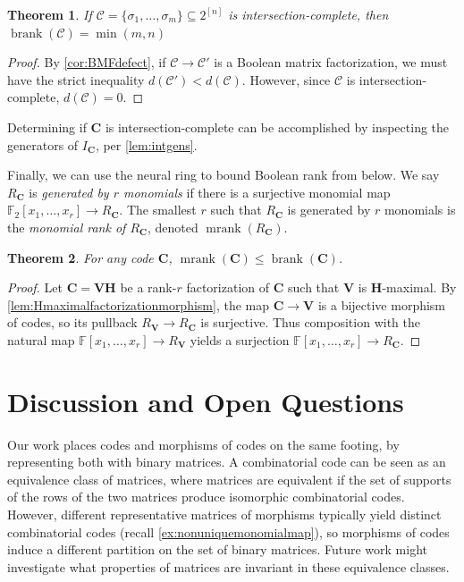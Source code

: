 \documentclass[11pt,letterpaper, reqno]{amsart}
\newtheorem{thm}{Theorem}[section]   %
\theoremstyle{definition}
\DeclareMathOperator{\brank}{brank}
\DeclareMathOperator{\mrank}{mrank}
\def\F{\mathbb{F}}
\def\bC{\mathbf{C}}
\def\bH{\mathbf{H}}
\def\bV{\mathbf{V}}
\def\cC{\mathcal{C}}
\begin{document}
        \begin{thm}\label{thm:intcompletefullrank}
            If $\cC = \{\sigma_1,\dots,\sigma_m\} \subseteq 2^{[n]}$ is intersection-complete, then $\brank(\cC) = \min(m,n)$
        \end{thm}
        \begin{proof}
            By \cref{cor:BMFdefect}, if $\cC \to \cC'$ is a Boolean matrix factorization, we must have the strict inequality $d(\cC') < d(\cC)$.
            However, since $\cC$ is intersection-complete, $d(\cC) = 0$.
        \end{proof}


        \noindent Determining if $\bC$ is intersection-complete can be accomplished by inspecting the generators of $I_\bC$, per \cref{lem:intgens}.



        Finally, we can use the neural ring to bound Boolean rank from below.
        We say $R_\bC$ is \emph{generated by $r$ monomials} if there is a surjective monomial map $\F_2[x_1,\dots,x_r] \to R_\bC$. The smallest $r$ such that $R_\bC$ is generated by $r$ monomials is the \emph{monomial rank of $R_\bC$}, denoted $\mrank(R_\bC)$.

        \begin{thm}\label{thm:monomialrankbound}
            For any code $\bC$, $\mrank(\bC) \leq \brank(\bC)$.
        \end{thm}
        \begin{proof}
            Let $\bC = \bV\bH$ be a rank-$r$ factorization of $\bC$ such that $\bV$ is $\bH$-maximal. By \cref{lem:Hmaximalfactorizationmorphism}, the map $\bC \to \bV$ is a bijective morphism of codes, so its pullback $R_\bV \to R_\bC$ is surjective. Thus composition with the natural map $\F[x_1,\dots,x_r] \to R_\bV$ yields a surjection $\F[x_1,\dots,x_r] \to R_\bC$.
        \end{proof}


\section{Discussion and Open Questions}\label{sec:conclusion}

Our work places codes and morphisms of codes on the same footing, by representing both with binary matrices.
A combinatorial code can be seen as an equivalence class of matrices, where matrices are equivalent if the set of supports of the rows of the two matrices produce isomorphic combinatorial codes.
However, different representative matrices of morphisms typically yield distinct combinatorial codes (recall \cref{ex:nonuniquemonomialmap}), so morphisms of codes induce a different partition on the set of binary matrices.
Future work might investigate what properties of matrices are invariant in these equivalence classes.
\end{document}
